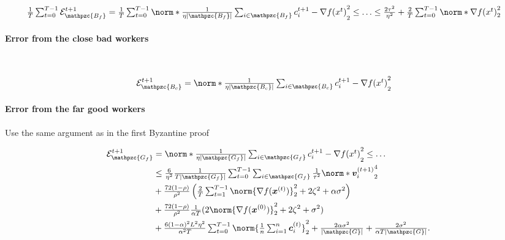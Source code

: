 \documentclass{article}
\newcommand{\gset}{\ensuremath{{\mathpzc{G}}}}
\newcommand{\bcset}{\ensuremath{{\mathpzc{B_c}}}}
\newcommand{\gfset}{\ensuremath{{\mathpzc{G_f}}}}
\newcommand{\bfset}{\ensuremath{{\mathpzc{B_f}}}}
\begin{document}
\begin{align*}
  \tfrac{1}{T} \tsum_{t=0}^{T-1} \cE_\bfset^{t+1}
   & =
  \tfrac{1}{T} \tsum_{t=0}^{T-1} \norm*{ \tfrac{1}{\eta |\bfset|} \tsum_{i\in\bfset} c_i^{t+1} - \nabla f(x^t) }_2^2
  \le
  \ldots
  \le
  \tfrac{2\tau^2}{\eta^2} + \tfrac{2}{T} \tsum_{t=0}^{T-1} \norm*{ \nabla f(x^t) }_2^2
\end{align*}


\paragraph*{Error from the close bad workers}

~

\begin{align*}
  \cE_\bcset^{t+1}
   & =
  \norm*{ \tfrac{1}{\eta |\bcset|} \tsum_{i\in\bcset} c_i^{t+1} - \nabla f(x^t) }_2^2
\end{align*}


\paragraph*{Error from the far good workers}

Use the same argument as in the first Byzantine proof

\begin{align*}
  \cE_\gfset^{t+1}
   & =
  \norm*{ \tfrac{1}{\eta |\gfset|} \tsum_{i\in\gfset} c_i^{t+1} - \nabla f(x^t) }_2^2
  \le
  \ldots
  \\
   & \le
  \tfrac{6}{\eta^2}\tfrac{1}{T|\gfset|}\tsum_{t=0}^{T-1}\tsum_{i\in\gfset} \tfrac{1}{\tau^2} \norm*{ \vv_i^{(t+1)}  }_2^4 \\
   & +
  \tfrac{72(1-\rho)}{\rho^2} \left(\tfrac{2}{T}\tsum_{t=1}^{T-1} \norm{\nabla f(\xx^{(t)}) }_2^2
  +  2  \zeta^2
  + \alpha\sigma^2 \right)                                                                                                \\
   & +
  \tfrac{72(1-\rho)}{\rho^2} \tfrac{1}{\alpha T}(2\norm{\nabla f(\xx^{(0)}) }_2^2
  + 2 \zeta^2 + \sigma^2)                                                                                                 \\
   & +
  \tfrac{6(1-\alpha)^2L^2\eta^2}{\alpha^2T} \tsum_{t=0}^{T-1}
  \norm{ \tfrac{1}{n} \tsum_{i=1}^n \cc_i^{(t)} }_2^2
  + \tfrac{2\alpha\sigma^2}{|\gset|} + \tfrac{2\sigma^2}{ \alpha  T|\gset|}.
\end{align*}
\end{document}
